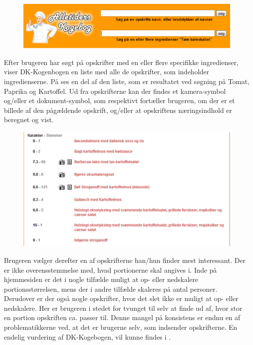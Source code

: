\begin{figure}[H]
\centering
\includegraphics[scale=0.7]{billeder/forbilleder/dk-kogebogen.png}
\label{fig:dk-kogebogen1}
\end{figure}

Efter brugeren har søgt på opskrifter med en eller flere specifikke ingredienser, viser DK-Kogenbogen en liste med alle de opskrifter, som indeholder ingredienserne. På  ses en del af den liste, som er resultatet ved søgning på Tomat, Paprika og Kartoffel. Ud fra opskrifterne kan der findes et kamera-symbol og/eller et dokument-symbol, som respektivt fortæller brugeren, om der er et billede af den pågældende opskrift, og/eller at opskriftens næringsindhold er beregnet og vist.


\begin{figure}[H]
\centering
\includegraphics[scale=0.7]{billeder/forbilleder/dk-kogebogen2.png}
\label{fig:dk-kogebogen2}
\end{figure}

Brugeren vælger derefter en af opskrifterne han/hun finder mest interessant. Der er ikke overensstemmelse med, hvad \fx portionerne skal angives i. Inde på hjemmesiden er det i nogle tilfælde muligt at op- eller nedskalere portionsstørrelsen, mens der i andre tilfælde skaleres på antal personer. Derudover er der også nogle opskrifter, hvor det slet ikke er muligt at op- eller nedskalere. Her er brugeren i stedet for tvunget til selv at finde ud af, hvor stor en portion opskriften ca. passer til. Denne mangel på konsistens er endnu en af problematikkerne ved, at det er brugerne selv, som indsender opskrifterne. En endelig vurdering af DK-Kogebogen, vil kunne findes i .
